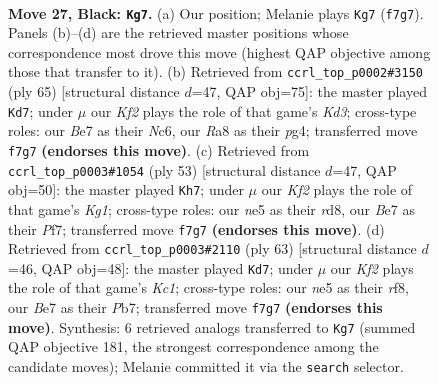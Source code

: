 \documentclass[11pt]{article}
\begin{document}
\clearpage

\begin{figure}[p]\centering
\begin{subfigure}{0.46\textwidth}\centering
\resizebox{\linewidth}{!}{%
\newchessgame
\chessboard[
  setfen={r7/p3bk2/2p3p1/4N1P1/P7/2N5/1P3P2/R1B1K3 b Q - 1 27},
  showmover=false,
  pgfstyle=straightmove, color=movearrow, markmove={f7-g7}
]}
\caption{}
\end{subfigure}\hfill
\begin{subfigure}{0.46\textwidth}\centering
\resizebox{\linewidth}{!}{%
\newchessgame
\chessboard[
  setfen={7r/5p2/2nk4/3p1Np1/p2P2P1/8/PP1R1P2/5K2 b - - 9 33},
  showmover=false,
  pgfstyle=straightmove, color=movearrow, markmove={d6-d7}
]}
\caption{}
\end{subfigure}
\\[4pt]
\begin{subfigure}{0.46\textwidth}\centering
\resizebox{\linewidth}{!}{%
\newchessgame
\chessboard[
  setfen={3R2k1/5pp1/r7/p7/b2B4/2P4P/5PP1/6K1 b - - 2 27},
  showmover=false,
  pgfstyle=straightmove, color=movearrow, markmove={g8-h7}
]}
\caption{}
\end{subfigure}\hfill
\begin{subfigure}{0.46\textwidth}\centering
\resizebox{\linewidth}{!}{%
\newchessgame
\chessboard[
  setfen={2k2R2/1p6/2p4p/p3bP2/P7/3B4/KP2P3/3r4 b - - 2 32},
  showmover=false,
  pgfstyle=straightmove, color=movearrow, markmove={c8-d7}
]}
\caption{}
\end{subfigure}
\caption{\textbf{Move 27, Black: \texttt{Kg7}.} (a) Our position; Melanie plays \texttt{Kg7} (\texttt{f7g7}). Panels (b)--(d) are the retrieved master positions whose correspondence most drove this move (highest QAP objective among those that transfer to it). (b) Retrieved from \texttt{ccrl\_top\_p0002\#3150} (ply 65) [structural distance $d$=47, QAP obj=75]: the master played \texttt{Kd7}; under $\mu$ our \emph{Kf2} plays the role of that game's \emph{Kd3}; cross-type roles: our \emph{B}e7 as their \emph{N}c6, our \emph{R}a8 as their \emph{p}g4; transferred move \texttt{f7g7} \textbf{(endorses this move)}. (c) Retrieved from \texttt{ccrl\_top\_p0003\#1054} (ply 53) [structural distance $d$=47, QAP obj=50]: the master played \texttt{Kh7}; under $\mu$ our \emph{Kf2} plays the role of that game's \emph{Kg1}; cross-type roles: our \emph{n}e5 as their \emph{r}d8, our \emph{B}e7 as their \emph{P}f7; transferred move \texttt{f7g7} \textbf{(endorses this move)}. (d) Retrieved from \texttt{ccrl\_top\_p0003\#2110} (ply 63) [structural distance $d$=46, QAP obj=48]: the master played \texttt{Kd7}; under $\mu$ our \emph{Kf2} plays the role of that game's \emph{Kc1}; cross-type roles: our \emph{n}e5 as their \emph{r}f8, our \emph{B}e7 as their \emph{P}b7; transferred move \texttt{f7g7} \textbf{(endorses this move)}. Synthesis: 6 retrieved analogs transferred to \texttt{Kg7} (summed QAP objective 181, the strongest correspondence among the candidate moves); Melanie committed it via the \texttt{search} selector.}
\label{fig:thought-m53}
\end{figure}
\end{document}
